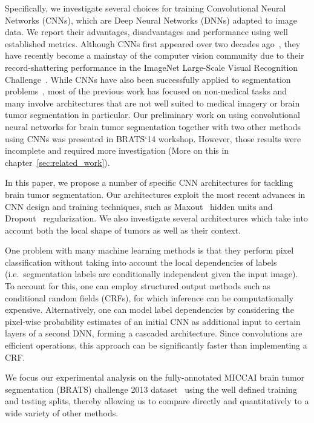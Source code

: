 \documentclass[final,5p,times,twocolumn]{elsarticle}
\begin{document}
Specifically, we investigate several choices for training Convolutional Neural Networks (CNNs), which are Deep Neural Networks (DNNs) adapted to image data. We report their advantages, disadvantages and performance using well established metrics. Although CNNs first appeared over two decades ago~\citep{lecun1998},
they have recently become a mainstay of the computer vision community due to their record-shattering performance in the ImageNet Large-Scale Visual Recognition Challenge~\citep{Krizhevsky-2012-small}.
While CNNs have also been successfully applied to segmentation problems~\citep{Alvarez2012,long_shelhamer_fcn,SimulDetectSegm, ciresan2012}, most of the previous work has focused on non-medical tasks and many involve architectures that are not well suited to medical imagery or brain tumor segmentation in particular.  Our preliminary work on using convolutional neural networks for brain tumor segmentation together with two other methods using CNNs was presented in BRATS`14 workshop. However, those results were incomplete and required more investigation (More on this in chapter~\ref{sec:related_work}).




In this paper, we propose a number of specific CNN architectures for tackling brain tumor segmentation. Our architectures exploit the most recent advances in CNN design and training techniques, such as Maxout~\citep{Goodfellow_maxout_2013} hidden units and Dropout~\citep{Srivastava14a} regularization.  We also investigate several architectures which take into account both the local shape of tumors as well as their context.  

One problem with many machine learning methods is that they perform pixel classification without taking into account the local dependencies of labels (i.e.\ segmentation labels are conditionally independent given the input image). To account for this, one can employ structured output methods such as conditional random fields (CRFs), for which inference can be computationally expensive.  Alternatively, one can model label dependencies by considering the pixel-wise probability estimates of an initial CNN as additional input to certain layers of a second DNN, forming a cascaded architecture. Since convolutions are efficient operations, this approach can be significantly faster than implementing a CRF. 






We focus our experimental analysis on the fully-annotated MICCAI brain tumor segmentation (BRATS) challenge 2013 dataset~\citep{braintumorsegmentationdotorg} using the well defined training and testing splits, thereby allowing us to compare directly and quantitatively to a wide variety of other methods.
\end{document}

